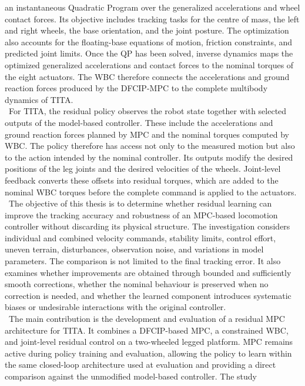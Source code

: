 an instantaneous Quadratic Program over the generalized accelerations and wheel
contact forces. Its objective includes tracking tasks for the centre of mass,
the left and right wheels, the base orientation, and the joint posture. The
optimization also accounts for the floating-base equations of motion, friction
constraints, and predicted joint limits. Once the QP has been solved, inverse
dynamics maps the optimized generalized accelerations and contact forces to the
nominal torques of the eight actuators. The WBC therefore connects the
accelerations and ground reaction forces produced by the DFCIP-MPC to the
complete multibody dynamics of TITA.\\
\
For TITA, the residual policy observes the robot state together with selected
outputs of the model-based controller. These include the accelerations and
ground reaction forces planned by MPC and the nominal torques computed by WBC.
The policy therefore has access not only to the measured motion but also to the
action intended by the nominal controller. Its outputs modify the desired
positions of the leg joints and the desired velocities of the wheels.
Joint-level feedback converts these offsets into residual torques, which are
added to the nominal WBC torques before the complete command is applied to the
actuators.\\
\
The objective of this thesis is to determine whether residual learning can
improve the tracking accuracy and robustness of an MPC-based locomotion
controller without discarding its physical structure. The investigation
considers individual and combined velocity commands, stability limits, control
effort, uneven terrain, disturbances, observation noise, and variations in
model parameters. The comparison is not limited to the final tracking error.
It also examines whether improvements are obtained through bounded and
sufficiently smooth corrections, whether the nominal behaviour is preserved
when no correction is needed, and whether the learned component introduces
systematic biases or undesirable interactions with the original controller.\\
\
The main contribution is the development and evaluation of a residual MPC
architecture for TITA. It combines a DFCIP-based MPC, a constrained WBC, and
joint-level residual control on a two-wheeled legged platform. MPC remains
active during policy training and evaluation, allowing the policy to learn
within the same closed-loop architecture used at evaluation and providing a
direct comparison against the unmodified model-based controller. The study
